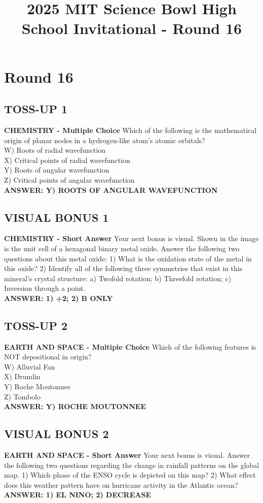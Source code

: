 \documentclass{article}
\title{2025 MIT Science Bowl High School Invitational - Round 16}
\author{}
\date{}
\begin{document}
\maketitle

\section*{Round 16}

\subsection*{TOSS-UP 1}
\textbf{CHEMISTRY - Multiple Choice} Which of the following is the mathematical origin of planar nodes in a hydrogen-like atom's atomic orbitals? \\
W) Roots of radial wavefunction \\
X) Critical points of radial wavefunction \\
Y) Roots of angular wavefunction \\
Z) Critical points of angular wavefunction \\
\textbf{ANSWER: Y) ROOTS OF ANGULAR WAVEFUNCTION}

\subsection*{VISUAL BONUS 1}
\textbf{CHEMISTRY - Short Answer} Your next bonus is visual. Shown in the image is the unit cell of a hexagonal binary metal oxide. Answer the following two questions about this metal oxide:
1) What is the oxidation state of the metal in this oxide?
2) Identify all of the following three symmetries that exist in this mineral's crystal structure: a) Twofold rotation; b) Threefold rotation; c) Inversion through a point. \\
\textbf{ANSWER: 1) +2; 2) B ONLY}

\subsection*{TOSS-UP 2}
\textbf{EARTH AND SPACE - Multiple Choice} Which of the following features is NOT depositional in origin? \\
W) Alluvial Fan \\
X) Drumlin \\
Y) Roche Moutonnee \\
Z) Tombolo \\
\textbf{ANSWER: Y) ROCHE MOUTONNEE}

\subsection*{VISUAL BONUS 2}
\textbf{EARTH AND SPACE - Short Answer} Your next bonus is visual. Answer the following two questions regarding the change in rainfall patterns on the global map.
1) Which phase of the ENSO cycle is depicted on this map?
2) What effect does this weather pattern have on hurricane activity in the Atlantic ocean? \\
\textbf{ANSWER: 1) EL NINO; 2) DECREASE}
\end{document}
